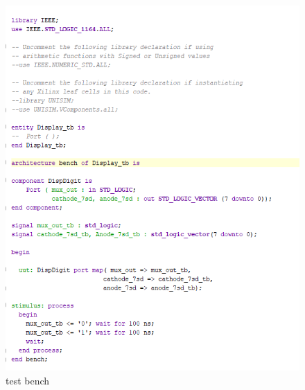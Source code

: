 \documentclass{article}
\begin{document}
\begin{figure}[h]
\begin{center}
\includegraphics[width=1\textwidth]{DisplayTestSource.png} %
\caption{test bench}
\end{center}
\end{figure}
\end{document}
